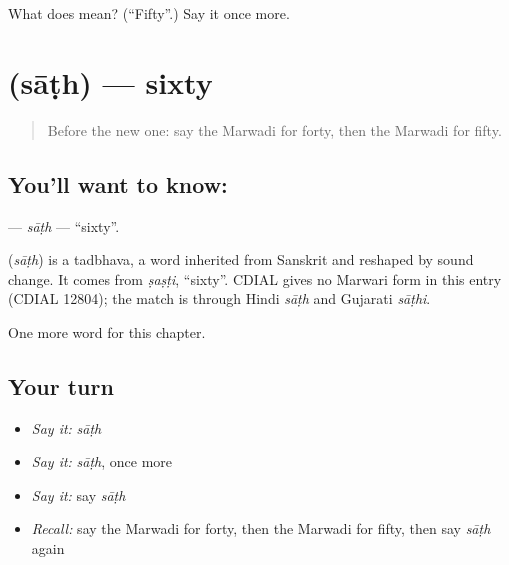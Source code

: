 \begin{tcolorbox}[breakable,colback=teal!4,colframe=teal!35!black,title={Before you move on}]
What does  mean? (\textquotedblleft{}Fifty\textquotedblright{}.) Say it once more.
\end{tcolorbox}
\section[\texorpdfstring{\mw{साठ} (sāṭh)}{साठ (sāṭh)}]{ (sāṭh) — sixty}

\label{lesson:MW-C86-sath}



\begin{quote}
Before the new one: say the Marwadi for forty, then the Marwadi for fifty.
\end{quote}

\subsection*{You'll want to know: }
\textbf{} — \emph{sāṭh} — \textquotedblleft{}sixty\textquotedblright{}.

\begin{cousinweb}
\textbf{} (\emph{sāṭh}) is a tadbhava, a word inherited from Sanskrit and reshaped by sound change. It comes from \emph{ṣaṣṭi}, \textquotedblleft{}sixty\textquotedblright{}. CDIAL gives no Marwari form in this entry (CDIAL 12804); the match is through Hindi \emph{sāṭh} and Gujarati \emph{sāṭhi}.
\end{cousinweb}

\begin{grammarlens}[title={What you've built}]
One more word for this chapter.
\end{grammarlens}

\subsection*{Your turn}
\begin{itemize}
\raggedright
  \item \emph{Say it:} \emph{sāṭh}
  \item \emph{Say it:} \emph{sāṭh}, once more
  \item \emph{Say it:} say \emph{sāṭh}
  \item \emph{Recall:} say the Marwadi for forty, then the Marwadi for fifty, then say \emph{sāṭh} again
\end{itemize}

